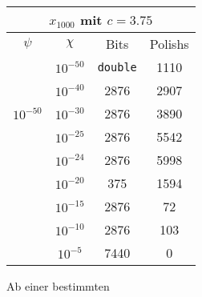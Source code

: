 \begin{center}
\begin{tabular}{|c|c|c|c|}
\hline
\multicolumn{4}{|c|}{$x_{1000}$ mit $c=3.75$}\\
\hline
 $\psi$ & $\chi$ & Bits & Polishs\\
 \hline
    & $10^{-50}$ & \verb+double+ & 1110 \\
    & $10^{-40}$ & 2876 & 2907\\
$10^{-50}$& $10^{-30}$ & 2876 & 3890\\
    & $10^{-25}$ & 2876 & 5542\\ 
    & $10^{-24}$ & 2876 & 5998\\ 
    & $10^{-20}$ & 375 & 1594\\
    & $10^{-15}$ & 2876 & 72\\
    & $10^{-10}$ & 2876 &103\\
    & $10^{-5}$ & 7440 & 0\\
 \hline
\end{tabular}
\end{center}



Ab einer bestimmten 


